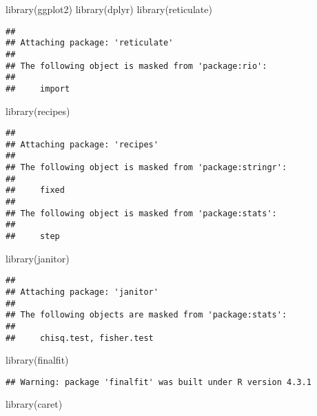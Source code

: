 \documentclass[
]{article}
\newenvironment{Shaded}{\begin{snugshade}}{\end{snugshade}}
\newcommand{\FunctionTok}[1]{\textcolor[rgb]{0.00,0.00,0.00}{#1}}
\newcommand{\NormalTok}[1]{#1}
\begin{document}
\begin{Shaded}
\begin{Highlighting}[]
\FunctionTok{library}\NormalTok{(ggplot2)}
\FunctionTok{library}\NormalTok{(dplyr)}
\FunctionTok{library}\NormalTok{(reticulate)}
\end{Highlighting}
\end{Shaded}

\begin{verbatim}
## 
## Attaching package: 'reticulate'
## 
## The following object is masked from 'package:rio':
## 
##     import
\end{verbatim}

\begin{Shaded}
\begin{Highlighting}[]
\FunctionTok{library}\NormalTok{(recipes)}
\end{Highlighting}
\end{Shaded}

\begin{verbatim}
## 
## Attaching package: 'recipes'
## 
## The following object is masked from 'package:stringr':
## 
##     fixed
## 
## The following object is masked from 'package:stats':
## 
##     step
\end{verbatim}

\begin{Shaded}
\begin{Highlighting}[]
\FunctionTok{library}\NormalTok{(janitor)}
\end{Highlighting}
\end{Shaded}

\begin{verbatim}
## 
## Attaching package: 'janitor'
## 
## The following objects are masked from 'package:stats':
## 
##     chisq.test, fisher.test
\end{verbatim}

\begin{Shaded}
\begin{Highlighting}[]
\FunctionTok{library}\NormalTok{(finalfit)}
\end{Highlighting}
\end{Shaded}

\begin{verbatim}
## Warning: package 'finalfit' was built under R version 4.3.1
\end{verbatim}

\begin{Shaded}
\begin{Highlighting}[]
\FunctionTok{library}\NormalTok{(caret)}
\end{Highlighting}
\end{Shaded}
\end{document}

